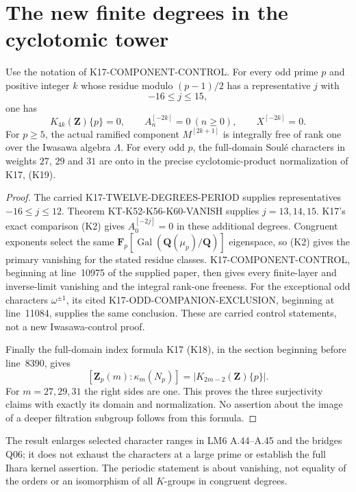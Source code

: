 \section{The new finite degrees in the cyclotomic tower}
\label{sec:component-extension}

\begin{corollary}
Use the notation of K17-COMPONENT-CONTROL. For every odd prime
$p$ and positive integer $k$ whose residue modulo $(p-1)/2$
has a representative $j$ with
\[
                         -16\le j\le15,
\]
one has
\[
 K_{4k}(\mathbf Z)\{p\}=0,\qquad
 A_n^{[-2k]}=0\ (n\ge0),\qquad X^{[-2k]}=0.
\]
For $p\ge5$, the actual ramified component $M^{[2k+1]}$ is
integrally free of rank one over the Iwasawa algebra $\Lambda$.
For every odd $p$, the full-domain Soul\'e characters in weights
$27$, $29$ and $31$ are onto in the precise cyclotomic-product
normalization of K17, (K19).
\end{corollary}
\begin{proof}
The carried K17-TWELVE-DEGREES-PERIOD supplies representatives
$-16\le j\le12$. Theorem KT-K52-K56-K60-VANISH supplies $j=13,14,15$.
K17's exact comparison (K2) gives $A_0^{[-2j]}=0$ in these
additional degrees. Congruent exponents select the same
$\mathbf F_p[\operatorname{Gal}(\mathbf Q(\mu_p)/\mathbf Q)]$
eigenspace, so (K2) gives the primary vanishing for the stated
residue classes. K17-COMPONENT-CONTROL, beginning at line~10975
of the supplied paper, then gives every finite-layer and
inverse-limit vanishing and the integral rank-one freeness.
For the exceptional odd characters $\omega^{\pm1}$, its cited
K17-ODD-COMPANION-EXCLUSION, beginning at line~11084,
supplies the same conclusion. These are carried control
statements, not a new Iwasawa-control proof.

Finally the full-domain index formula K17 (K18), in the section
beginning before line~8390, gives
\[
 [\mathbf Z_p(m):\kappa_m(N_p)]
       =|K_{2m-2}(\mathbf Z)\{p\}|.
\]
For $m=27,29,31$ the right sides are one. This proves the three
surjectivity claims with exactly its domain and normalization.
No assertion about the image of a deeper filtration subgroup
follows from this formula.
\end{proof}

The result enlarges selected character ranges in LM6 A.44--A.45
and the bridges Q06; it does not exhaust the characters at a
large prime or establish the full Ihara kernel assertion.
The periodic statement is about vanishing, not equality of the
orders or an isomorphism of all $K$-groups in congruent degrees.
